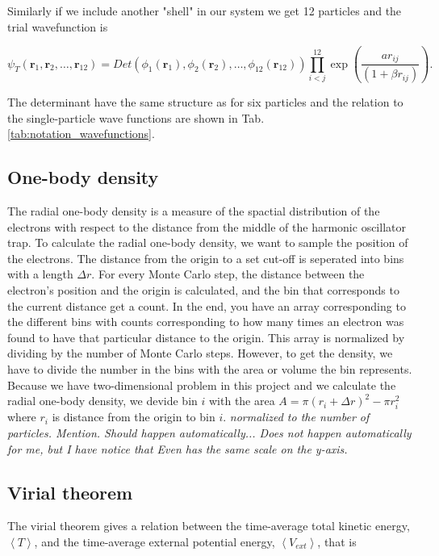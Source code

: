 Similarly if we include another "shell" in our system we get 12 particles and the trial wavefunction is 

\begin{equation}
   \psi_{T}(\bm{r}_1,\bm{r}_2, \dots,\bm{r}_{12}) = 
   Det\left(\phi_{1}(\bm{r}_1),\phi_{2}(\bm{r}_2),
   \dots,\phi_{12}(\bm{r}_{12})\right)
   \prod_{i<j}^{12}\exp{\left(\frac{ar_{ij}}{(1+\beta r_{ij})}\right)}.
\end{equation}

The determinant have the same structure as for six particles and the relation to the single-particle wave functions are shown in Tab. \ref{tab:notation_wavefunctions}.

\subsection{One-body density}

The radial one-body density is a measure of the spactial distribution of the electrons with respect to the distance from the middle of the harmonic oscillator trap. To calculate the radial one-body density, we want to sample the position of the electrons. The distance from the origin to a set cut-off is seperated into bins with a length $\Delta r$. For every Monte Carlo step, the distance between the electron's position and the origin is calculated, and the bin that corresponds to the current distance get a count. In the end, you have an array corresponding to the different bins with counts corresponding to how many times an electron was found to have that particular distance to the origin. This array is normalized by dividing by the number of Monte Carlo steps. However, to get the density, we have to divide the number in the bins with the area or volume the bin represents. Because we have two-dimensional problem in this project and we calculate the radial one-body density, we devide bin $i$ with the area $ A = \pi (r_i+\Delta r)^2 - \pi r_i^2$ where $r_i$ is distance from the origin to bin $i$. \textit{normalized to the number of particles. Mention. Should happen automatically... Does not happen automatically for me, but I have notice that Even has the same scale on the y-axis.}\cite{Evens_master}

\subsection{Virial theorem}

The virial theorem gives a relation between the time-average total kinetic energy, $\left<T\right>$, and the time-average external potential energy, $\left<V_{ext}\right>$, that is

